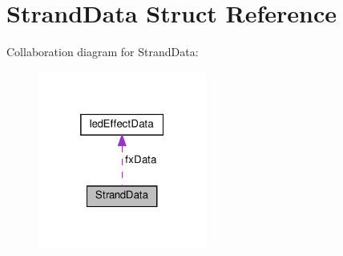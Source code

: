 \hypertarget{structStrandData}{}\section{Strand\+Data Struct Reference}
\label{structStrandData}


Collaboration diagram for Strand\+Data\+:\nopagebreak
\begin{figure}[H]
\begin{center}
\leavevmode
\includegraphics[width=157pt]{structStrandData__coll__graph}
\end{center}
\end{figure}
